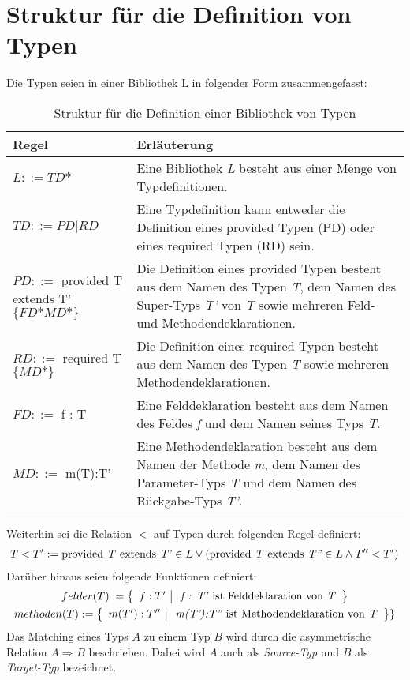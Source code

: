 \documentclass[a4paper,12pt]{article}
\newcommand{\matchTyp}[3]
{
#1  
\Rightarrow_{#2}
 #3
}
\begin{document}
\section{Struktur für die Definition von Typen}
Die Typen seien in einer Bibliothek $\text{L}$ in folgender Form zusammengefasst:
\begin{table}[H]
\centering
\begin{tabular}{|p{6cm}|p{8cm}|}
\hline
\hline
\centering\textbf{Regel} & \textbf{Erläuterung} \\
\hline
\hline
$L ::= TD\text{*}$ & Eine Bibliothek \emph{L} besteht aus einer Menge von Typdefinitionen.\\
\hline
$TD ::= PD | RD$ & Eine Typdefinition kann entweder die Definition eines provided Typen (PD) oder eines required Typen (RD) sein.\\
\hline
$PD ::=$ provided T extends T' $\{ FD\text{*} MD\text{*}\}$& Die Definition eines provided Typen besteht aus dem Namen des Typen \emph{T}, dem Namen des Super-Typs \emph{T'} von \emph{T} sowie mehreren Feld- und Methodendeklarationen.\\
\hline
$RD ::=$ required T $\{MD\text{*}\}$ & Die Definition eines required Typen besteht aus dem Namen des Typen \emph{T} sowie mehreren Methodendeklarationen.\\
\hline
$FD ::=$ f : T & Eine Felddeklaration besteht aus dem Namen des Feldes \emph{f} und dem Namen seines Typs \emph{T}.\\
\hline
$MD ::=$ m(T):T' & Eine Methodendeklaration besteht aus dem Namen der Methode \emph{m}, dem Namen des Parameter-Typs \emph{T} und dem Namen des Rückgabe-Typs \emph{T'}.\\
\hline
\hline
\end{tabular}
\caption{Struktur für die Definition einer Bibliothek von Typen}
 \label{tab:eIShort}
\end{table}
\noindent
Weiterhin sei die Relation $<$ auf Typen durch folgenden Regel definiert:
\begin{eqnarray*}
T < T' := \text{provided \emph{T} extends \emph{T'}} \in L \vee (\text{provided \emph{T} extends \emph{T''}} \in L \wedge T'' < T') 
\end{eqnarray*}
Darüber hinaus seien folgende Funktionen definiert:
\begin{gather*}
felder(T) :=  \left\{ 
				\begin{array}{l|l}
					f : T' & \text{ \emph{f : T'} ist Felddeklaration von \emph{T}}
				\end{array}
              \right\}\\
methoden(T) := \left\{ 
				\begin{array}{l|l}
					m(T'):T'' & \text{ \emph{m(T'):T''} ist Methodendeklaration von 										\emph{T}}
				\end{array}
              \right\}\}
\end{gather*}
\noindent
Das Matching eines Typs $A$ zu einem Typ $B$ wird durch die asymmetrische Relation $\matchTyp{A}{}{B}$ beschrieben. Dabei wird $A$ auch als \emph{Source-Typ} und $B$ als \emph{Target-Typ} bezeichnet.
\end{document}
